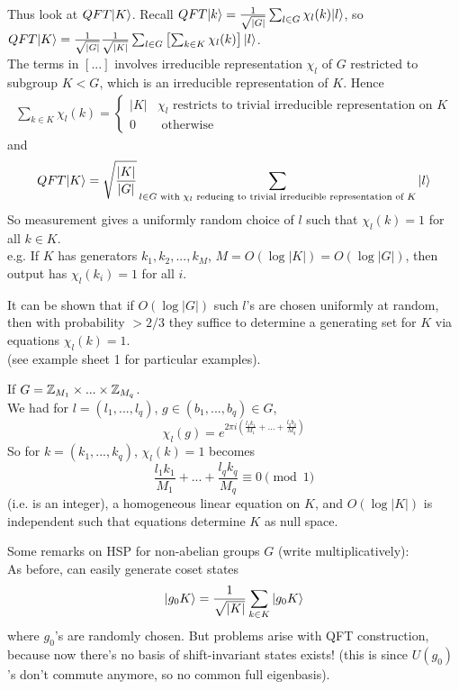 \documentclass[a4paper]{article}
\begin{document}
Thus look at $QFT|K \rangle$. Recall $QFT|k \rangle = \frac{1}{\sqrt{|G|}} \sum_{l \in G} \chi_l(k) |l\rangle$, so $QFT |K\rangle = \frac{1}{\sqrt{|G|}} \frac{1}{\sqrt{|K|}} \sum_{l \in G} \left[\sum_{k \in K} \chi_l(k) \right] |l\rangle$.\\
The terms in $[...]$ involves irreducible representation $\chi_l$ of $G$ restricted to subgroup $K < G$, which is an irreducible representation of $K$. Hence 
\begin{equation*}
    \begin{aligned}
        \sum_{k \in K} \chi_l(k) = \left\{
            \begin{array}{ll}
                |K| & \chi_l \text{ restricts to trivial irreducible representation on } K\\
                0 & \text{ otherwise}
            \end{array}
        \right.
    \end{aligned}
\end{equation*}
and
$$QFT|K\rangle = \sqrt{\frac{|K|}{|G|}} \sum_{l \in G \text{ with }\chi_l\text{ reducing to trivial irreducible representation of }K} |l\rangle$$
So measurement gives a uniformly random choice of $l$ such that $\chi_l(k) = 1$  for all $k \in K$.\\
e.g. If $K$ has generators $k_1,k_2,...,k_M$, $M=O(\log |K|) = O(\log |G|)$, then output has $\chi_l(k_i) = 1$ for all $i$.

It can be shown that if $O(\log|G|)$ such $l$'s are chosen uniformly at random, then with probability $>2/3$ they suffice to determine a generating set for $K$ via equations $\chi_l(k) = 1$.\\
(see example sheet 1 for particular examples).

\begin{eg}
    If $G = \mathbb{Z}_{M_1} \times ... \times \mathbb{Z}_{M_q}$.\\
    We had for $l=(l_1,...,l_q)$, $g \in (b_1,...,b_q) \in G$,
    $$\chi_l(g) = e^{2\pi i (\frac{l_1k_1}{M_1} + ... + \frac{l_qb_q}{M_q})}$$
    So for $k=(k_1,...,k_q)$, $\chi_l(k) = 1$ becomes
    $$\frac{l_1k_1}{M_1} + ... + \frac{l_qk_q}{M_q} \equiv 0 \pmod 1$$
    (i.e. is an integer), a homogeneous linear equation on $K$, and $O(\log |K|)$ is independent such that equations determine $K$ as null space.
\end{eg}

Some remarks on HSP for non-abelian groups $G$ (write multiplicatively):\\
As before, can easily generate coset states 
$$ |g_0 K \rangle = \frac{1}{\sqrt{|K|}} \sum_{k \in K} |g_0 K\rangle$$
where $g_0$'s are randomly chosen. But problems arise with QFT construction, because now there's no basis of shift-invariant states exists! (this is since $U(g_0)$'s don't commute anymore, so no common full eigenbasis).
\end{document}
